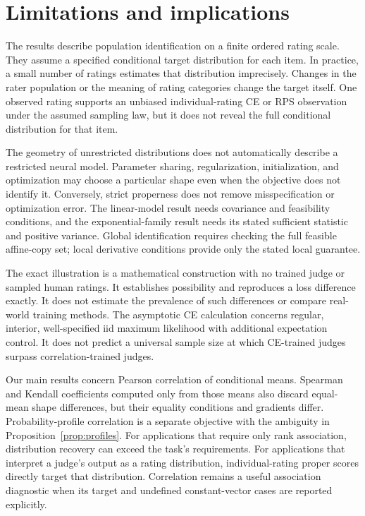 \section{Limitations and implications}
The results describe population identification on a finite ordered rating scale.
They assume a specified conditional target distribution for each item.
In practice, a small number of ratings estimates that distribution imprecisely.
Changes in the rater population or the meaning of rating categories change the target itself.
One observed rating supports an unbiased individual-rating CE or RPS observation under the assumed sampling law, but it does not reveal the full conditional distribution for that item.

The geometry of unrestricted distributions does not automatically describe a restricted neural model.
Parameter sharing, regularization, initialization, and optimization may choose a particular shape even when the objective does not identify it.
Conversely, strict properness does not remove misspecification or optimization error.
The linear-model result needs covariance and feasibility conditions, and the exponential-family result needs its stated sufficient statistic and positive variance.
Global identification requires checking the full feasible affine-copy set; local derivative conditions provide only the stated local guarantee.

The exact illustration is a mathematical construction with no trained judge or sampled human ratings.
It establishes possibility and reproduces a loss difference exactly.
It does not estimate the prevalence of such differences or compare real-world training methods.
The asymptotic CE calculation concerns regular, interior, well-specified iid maximum likelihood with additional expectation control.
It does not predict a universal sample size at which CE-trained judges surpass correlation-trained judges.

Our main results concern Pearson correlation of conditional means.
Spearman and Kendall coefficients computed only from those means also discard equal-mean shape differences, but their equality conditions and gradients differ.
Probability-profile correlation is a separate objective with the ambiguity in Proposition~\ref{prop:profiles}.
For applications that require only rank association, distribution recovery can exceed the task's requirements.
For applications that interpret a judge's output as a rating distribution, individual-rating proper scores directly target that distribution.
Correlation remains a useful association diagnostic when its target and undefined constant-vector cases are reported explicitly.
